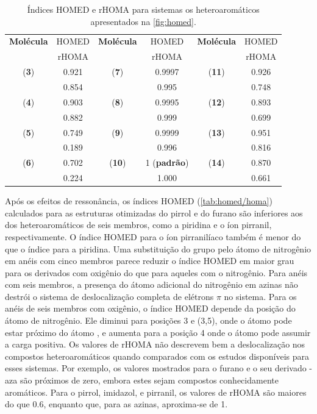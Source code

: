 \begin{table}[htb]
	\centering
	\caption{\label{tab:homed/homa} Índices \gls{HOMED} e \gls{rHOMA} para sistemas os heteroaromáticos apresentados na \autoref{fig:homed}.}
	\begin{tabular}{cccccc}
		\toprule
	\textbf{Molécula} & \gls{HOMED} & \textbf{Molécula} & \gls{HOMED} & \textbf{Molécula} & \gls{HOMED}
 \\
  & \gls{rHOMA} & & \gls{rHOMA} & & \gls{rHOMA}
 \\
		\midrule
    (\textbf{3}) & 0.921 & (\textbf{7}) & 0.9997 & (\textbf{11}) & 0.926 \\
    & 0.854 & & 0.995 & & 0.748 \\
    (\textbf{4}) & 0.903 & (\textbf{8}) & 0.9995  & (\textbf{12}) & 0.893 \\
    & 0.882 & & 0.999 & &  0.699 \\
    (\textbf{5}) & 0.749  & (\textbf{9}) & 0.9999 & (\textbf{13}) & 0.951 \\
    & 0.189 & & 0.996 & & 0.816 \\
    (\textbf{6}) & 0.702 & (\textbf{10}) & 1 (\textbf{padrão}) & (\textbf{14}) & 0.870  \\
    & 0.224 & & 1.000 & & 0.661 \\
    \bottomrule
	\end{tabular}
\end{table}

Após os efeitos de ressonância, os índices \gls{HOMED} (\autoref{tab:homed/homa}) calculados para as estruturas otimizadas do pirrol e do furano são inferiores aos dos heteroaromáticos de seis membros, como a piridina e o íon pirranil, respectivamente. O índice \gls{HOMED} para o íon pirranilíaco também é menor do que o índice para a piridina. Uma substituição do grupo  pelo átomo de nitrogênio em anéis com cinco membros parece reduzir o índice \gls{HOMED} em maior grau para os derivados com oxigênio do que para aqueles com o nitrogênio. Para anéis com seis membros, a presença do átomo adicional do nitrogênio em azinas não destrói o sistema de deslocalização completa de elétrons $\pi$ no sistema. Para os anéis de seis membros com oxigênio, o índice \gls{HOMED} depende da posição do átomo de nitrogênio. Ele diminui para posições 3 e (3,5), onde o átomo  pode estar próximo do átomo , e aumenta para a posição 4 onde o átomo  pode assumir a carga positiva. Os valores de \gls{rHOMA} não descrevem bem a deslocalização nos compostos heteroaromáticos quando comparados com os estudos disponíveis para esses sistemas. Por exemplo, os valores mostrados para o furano e o seu derivado -aza são próximos de zero, embora estes sejam compostos conhecidamente aromáticos. Para o pirrol, imidazol, e pirranil, os valores de \gls{rHOMA} são maiores do que 0.6, enquanto que, para as azinas, aproxima-se de 1. 

